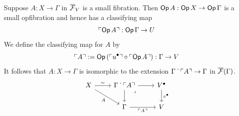 

Suppose $A : X \to \Gamma$ in ${\overline{{\mathcal{F}}}}_V$ is a small fibration.
Then $\mathop{\mathsf{Op}}{A} : \mathop{\mathsf{Op}}{X} \to \mathop{\mathsf{Op}}{\Gamma}$ is a small opfibration
and hence has a classifying map 
\[
\ulcorner \mathop{\mathsf{Op}}{A} \urcorner : \mathop{\mathsf{Op}}{\Gamma \to U}
\]
We define the classifying map for $A$ by
\[ \ulcorner A \urcorner := \mathop{\mathsf{Op}}{(\ulcorner {u^{\bullet}} \urcorner \circ \ulcorner \mathop{\mathsf{Op}}{A} \urcorner)} : \Gamma \to V\]
It follows that $A : X \to \Gamma$ is isomorphic to the extension
$\Gamma \mathrel{\dot{\,}} \ulcorner A \urcorner \to \Gamma$ in ${\overline{{\mathcal{F}}}}(\Gamma)$.
\[ \begin{tikzcd}
    X & {\Gamma \ext \ulcorner A \urcorner} & \Vlow \\
    & \Gamma & \V
    \arrow["\sim", from=1-1, to=1-2]
    \arrow["A"', from=1-1, to=2-2]
    \arrow[from=1-2, to=1-3]
    \arrow[from=1-2, to=2-2]
    \arrow["\lrcorner"{anchor=center, pos=0.125}, draw=none, from=1-2, to=2-3]
    \arrow["\vlow", from=1-3, to=2-3]
    \arrow["{\ulcorner A \urcorner}"', from=2-2, to=2-3]
  \end{tikzcd} \]

